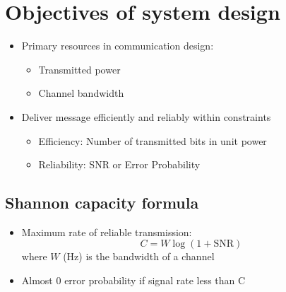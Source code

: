 \documentclass[conference]{IEEEtran}
\begin{document}
\pagebreak
\section{\textbf{Objectives of system design}}

\begin{itemize}
    \item Primary resources in communication design:
    \begin{itemize}
        \item Transmitted power 
        \item Channel bandwidth 
    \end{itemize}

    \item Deliver message efficiently and reliably within constraints
    \begin{itemize}
        \item Efficiency: Number of transmitted bits in unit power 
        \item Reliability: SNR or Error Probability
    \end{itemize}
\end{itemize}

\subsection{Shannon capacity formula}

\begin{itemize}
    \item Maximum rate of reliable transmission: 
    $$
        C = W\log(1+\text{SNR})
    $$
    where $W$ (Hz) is the bandwidth of a channel 

    \item Almost $0$ error probability if signal rate less than C 
\end{itemize}





\end{document}

